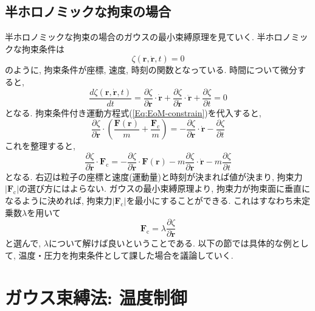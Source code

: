 \subsection{半ホロノミックな拘束の場合}
半ホロノミックな拘束の場合のガウスの最小束縛原理を見ていく.
半ホロノミックな拘束条件は
\begin{equation}
    \zeta(\bm{r}, \dot{\bm{r}}, t) = 0
\end{equation}
のように, 拘束条件が座標, 速度, 時刻の関数となっている.
時間について微分すると,
\begin{equation}
    \frac{d \zeta(\bm{r}, \dot{\bm{r}}, t)}{dt}
    =
    \frac{\partial \zeta}{\partial \bm{r}}
    \cdot \dot{\bm{r}}
    +
    \frac{\partial \zeta}{\partial \dot{\bm{r}}}
    \cdot \ddot{\bm{r}}
    +
    \frac{\partial \zeta}{\partial t}
    =0
\end{equation}
となる.
拘束条件付き運動方程式(\ref{Eq:EoM-constrain})を代入すると,
\begin{equation}
    \frac{\partial \zeta}{\partial \dot{\bm{r}}}
    \cdot
    \left(
        \frac{\bm{F}(\bm{r})}{m}
        +
        \frac{\bm{F}_{\mathrm{c}}}{m}
    \right)
    =
    -
    \frac{\partial \zeta}{\partial \bm{r}}
    \cdot
    \dot{\bm{r}}
    -
    \frac{\partial \zeta}{\partial t}
\end{equation}
これを整理すると,
\begin{equation}
    \frac{\partial \zeta}{\partial \dot{\bm{r}}}
    \cdot
    \bm{F}_{\mathrm{c}}
    =
    -
    \frac{\partial \zeta}{\partial \dot{\bm{r}}}
    \cdot
    \bm{F}(\bm{r})
    - m
    \frac{\partial \zeta}{\partial \bm{r}}
    \cdot
    \dot{\bm{r}}
    - m
    \frac{\partial \zeta}{\partial t}
\end{equation}
となる. 
右辺は粒子の座標と速度(運動量)と時刻が決まれば値が決まり, 拘束力$|\bm{F}_{\mathrm{c}}|$の選び方にはよらない.
ガウスの最小束縛原理より, 拘束力が拘束面に垂直になるように決めれば, 拘束力$|\bm{F}_{\mathrm{c}}|$を最小にすることができる.
これはすなわち未定乗数$\lambda$を用いて
\begin{equation}
    \bm{F}_{\mathrm{c}}
    =
    \lambda
    \frac{\partial \zeta}{\partial \dot{\bm{r}}}
    \label{Eq:Select-Fc}
\end{equation}
と選んで, $\lambda$について解けば良いということである.
以下の節では具体的な例として, 温度・圧力を拘束条件として課した場合を議論していく.

\section{ガウス束縛法: 温度制御}

